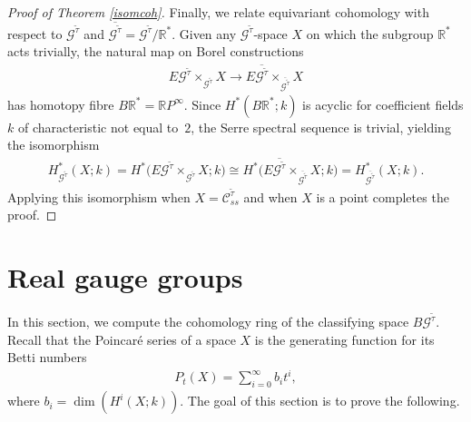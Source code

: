 \documentclass[pdftex]{sigma}
\numberwithin{equation}{section}
\begin{document}
\begin{proof}[Proof of Theorem \ref{isomcoh}]
Finally, we relate equivariant cohomology with respect to ${\mathcal G}^{\tilde{\tau}} $ and $\overline{{\mathcal G}^{\tilde{\tau}}} = {\mathcal G}^{\tilde{\tau}}/{\mathbb R}^*$. Given any ${\mathcal G}^{\tilde{\tau}}$-space $X$ on which the subgroup ${\mathbb R}^*$ acts trivially, the natural map on Borel constructions
\begin{gather*} E{\mathcal G}^{\tilde{\tau}} \times_{{\mathcal G}^{\tilde{\tau}}} X \rightarrow E\overline{{\mathcal G}^{\tilde{\tau}}} \times_{\overline{{\mathcal G}^{\tilde{\tau}}}} X \end{gather*}
has homotopy f\/ibre $B{\mathbb R}^* = {\mathbb R} P^{\infty}$. Since $H^*(B{\mathbb R}^*;k)$ is acyclic for coef\/f\/icient f\/ields $k$ of characteristic not equal to~$2$, the Serre spectral sequence is trivial, yielding the isomorphism
\begin{gather*}H^*_{{\mathcal G}^{\tilde{\tau}}}( X;k) = H^*\big( E{\mathcal G}^{\tilde{\tau}} \times_{{\mathcal G}^{\tilde{\tau}}} X; k\big) \cong H^*\big( E\overline{{\mathcal G}^{\tilde{\tau}}} \times_{\overline{{\mathcal G}^{\tilde{\tau}}}} X; k\big) = H^*_{\overline{{\mathcal G}^{\tilde{\tau}}}}( X;k) . \end{gather*}
Applying this isomorphism when $X = {\mathcal C}_{ss}^{\tilde{\tau}}$ and when $X$ is a point completes the proof.
\end{proof}

\section{Real gauge groups}\label{SScalcReal}

In this section, we compute the cohomology ring of the classifying space $B{\mathcal G}^{{\tilde{\tau}}}$. Recall that the Poincar\'e series of a space $X$ is the generating function for its Betti numbers \begin{gather*} P_t(X) = \sum_{i=0}^{\infty} b_it^i, \end{gather*}
where $b_i = \dim(H^i(X;k))$. The goal of this section is to prove the following.
\end{document}
